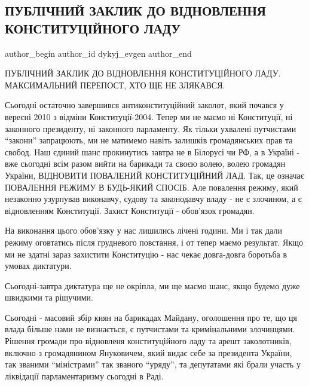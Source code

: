  
 
 
 
 
 
\subsection{ПУБЛІЧНИЙ ЗАКЛИК ДО ВІДНОВЛЕННЯ КОНСТИТУЦІЙНОГО ЛАДУ}
\label{sec:16_01_2014.fb.dykyj_evgen.1.zaklyk}
 
\ifcmt
 author_begin
   author_id dykyj_evgen
 author_end
\fi

ПУБЛІЧНИЙ ЗАКЛИК ДО ВІДНОВЛЕННЯ КОНСТИТУЦІЙНОГО ЛАДУ. МАКСИМАЛЬНИЙ ПЕРЕПОСТ,
ХТО ЩЕ НЕ ЗЛЯКАВСЯ.

Сьогодні остаточно завершився антиконституційний заколот, який почався у
вересні 2010 з відміни Конституції-2004. Тепер ми не маємо ні Конституції, ні
законного президенту, ні законного парламенту. Як тільки ухвалені путчистами
\enquote{закони} запрацюють, ми не матимемо навіть залишків громадянських прав та
свобод. Наш єдиний шанс прокинутись завтра не в Білорусі чи РФ, а в Україні -
вже сьогодні всім разом вийти на барикади та своєю волею, волею громадян
України, ВІДНОВИТИ ПОВАЛЕНИЙ КОНСТИТУЦІЙНИЙ ЛАД. Так, це означає ПОВАЛЕННЯ
РЕЖИМУ В БУДЬ-ЯКИЙ СПОСІБ.  Але повалення режиму, який незаконно узурпував
виконавчу, судову та законодавчу владу - не є злочином, а є відновленням
Конституції. Захист Конституції - обов'язок громадян.

На виконання цього обов'язку у нас лишились лічені години. Ми і так дали режиму
оговтатись після грудневого повстання, і от тепер маємо результат. Якщо ми не
здатні зараз захистити Конституцію - нас чекає довга-довга боротьба в умовах
диктатури.

Сьогодні-завтра диктатура ще не окріпла, ми ще маємо шанс, якщо будемо дуже
швидкими та рішучими.

Сьогодні - масовий збір киян на барикадах Майдану, оголошення про те, що ця
влада більше нами не визнається, є путчистами та кримінальними злочинцями.
Рішення громади про відновленя конституційного ладу та арешт заколотників,
включно з громадянином Януковичем, який видає себе за президента України, так
званими \enquote{міністрами} так званого \enquote{уряду}, та депутатами які брали участь у
ліквідації парламентаризму сьогодні в Раді.

